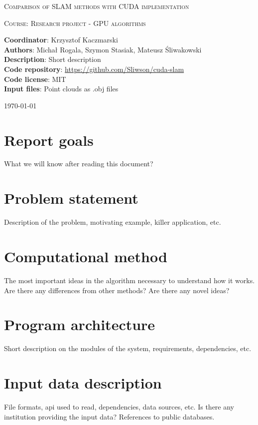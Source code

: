 \documentclass[titlepage]{article}
\begin{document}
\begin{titlepage}
	{\centering
	{\scshape\huge Comparison of SLAM methods with CUDA implementation \par}
	\vspace{1cm}
	{\scshape\Large Course: Research project - GPU algorithms \par}}
	
	\vspace{1cm}
	\noindent\textbf{Coordinator}: Krzysztof Kaczmarski\\
	\textbf{Authors}: Michał Rogala, Szymon Stasiak, Mateusz Śliwakowski\\
	\textbf{Description}: Short description\\
	\textbf{Code repository}: \href{https://github.com/Sliwson/cuda-slam}{https://github.com/Sliwson/cuda-slam}\\
	\textbf{Code license}: MIT\\
	\textbf{Input files}: Point clouds as .obj files\\

	\vfill
	{\large \today \par}
\end{titlepage}

\tableofcontents
\newpage

\section{Report goals}
What we will know after reading this document?
\section{Problem statement}
Description of the problem, motivating example, killer application, etc.
\section{Computational method}
The most important ideas in the algorithm necessary to understand how it works.
Are there any differences from other methods?
Are there any novel ideas?
\section{Program architecture}
Short description on the modules of the system, requirements, dependencies, etc.
\section{Input data description}
File formats, api used to read, dependencies, data sources, etc.
Is there any institution providing the input data?
References to public databases.
\end{document}
